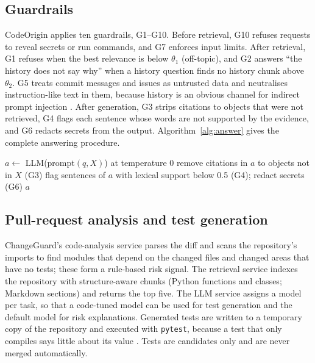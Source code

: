 \documentclass[12pt,onecolumn,draftclsnofoot]{IEEEtran}
\begin{document}
\subsection{Guardrails}
CodeOrigin applies ten guardrails, G1--G10. Before retrieval, G10 refuses requests to reveal secrets or run commands, and G7 enforces input limits. After retrieval, G1 refuses when the best relevance is below $\theta_1$ (off-topic), and G2 answers ``the history does not say why'' when a history question finds no history chunk above $\theta_2$. G5 treats commit messages and issues as untrusted data and neutralises instruction-like text in them, because history is an obvious channel for indirect prompt injection \cite{greshake2023injection}. After generation, G3 strips citations to objects that were not retrieved, G4 flags each sentence whose words are not supported by the evidence, and G6 redacts secrets from the output. Algorithm~\ref{alg:answer} gives the complete answering procedure.

\begin{algorithm}[!t]
\caption{History-aware answering with guardrails}
\label{alg:answer}
$a \leftarrow$ LLM(prompt$(q, X)$) at temperature 0\;
remove citations in $a$ to objects not in $X$ (G3)\;
flag sentences of $a$ with lexical support below 0.5 (G4); redact secrets (G6)\;
\Return $a$\;
\end{algorithm}

\subsection{Pull-request analysis and test generation}
ChangeGuard's code-analysis service parses the diff and scans the repository's imports to find modules that depend on the changed files and changed areas that have no tests; these form a rule-based risk signal. The retrieval service indexes the repository with structure-aware chunks (Python functions and classes; Markdown sections) and returns the top five. The LLM service assigns a model per task, so that a code-tuned model can be used for test generation and the default model for risk explanations. Generated tests are written to a temporary copy of the repository and executed with \texttt{pytest}, because a test that only compiles says little about its value \cite{alshahwan2024testgen}. Tests are candidates only and are never merged automatically.
\end{document}
